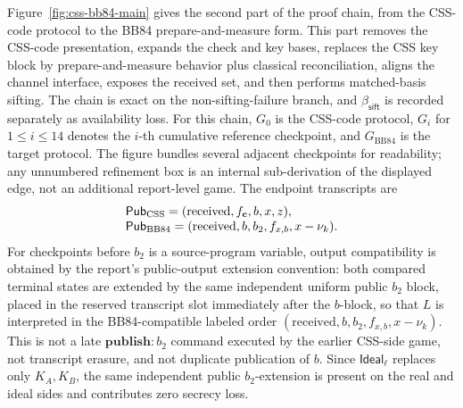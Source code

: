 \documentclass[conference,compsoc]{IEEEtran}
\newcommand{\bb}{\textsf{BB84}\xspace}
\newcommand{\Ideal}{\mathsf{Ideal}}
\begin{document}
Figure~\ref{fig:css-bb84-main} gives the second part of the proof chain, from
the CSS-code protocol to the \bb prepare-and-measure form. This part removes the
CSS-code presentation, expands the check and key bases, replaces the CSS key
block by prepare-and-measure behavior plus classical reconciliation, aligns the
channel interface, exposes the received set, and then performs matched-basis
sifting. The chain is exact on the non-sifting-failure branch, and
\(\beta_{\mathsf{sift}}\) is recorded separately as availability loss. For this
chain, \(G_0\) is the CSS-code protocol, \(G_i\) for \(1\le i\le14\) denotes
the \(i\)-th cumulative reference checkpoint, and \(G_{\mathrm{BB84}}\) is the
target protocol. The figure bundles several adjacent checkpoints for
readability; any unnumbered refinement box is an internal sub-derivation of the
displayed edge, not an additional report-level game. The endpoint transcripts
are
\[
\begin{array}{@{}l@{}}
\mathsf{Pub}_{\mathrm{CSS}}
  =(\mathrm{received},f_{\mathbf c},b,x,z),\\
\mathsf{Pub}_{\mathrm{BB84}}
  =(\mathrm{received},b,b_2,f_{x,b},x-\nu_k).
\end{array}
\]
For checkpoints before \(b_2\) is a source-program variable, output
compatibility is obtained by the report's public-output extension convention:
both compared terminal states are extended by the same independent uniform
public \(b_2\) block, placed in the reserved transcript slot immediately after
the \(b\)-block, so that \(L\) is interpreted in the \bb-compatible labeled
order
\((\mathrm{received},b,b_2,f_{x,b},x-\nu_k)\). This is not a late
\(\mathbf{publish: }b_2\) command executed by the earlier CSS-side game, not
transcript erasure, and not duplicate publication of \(b\). Since
\(\Ideal_\ell\) replaces only \(K_A,K_B\), the same independent public
\(b_2\)-extension is present on the real and ideal sides and contributes zero
secrecy loss.
\end{document}
